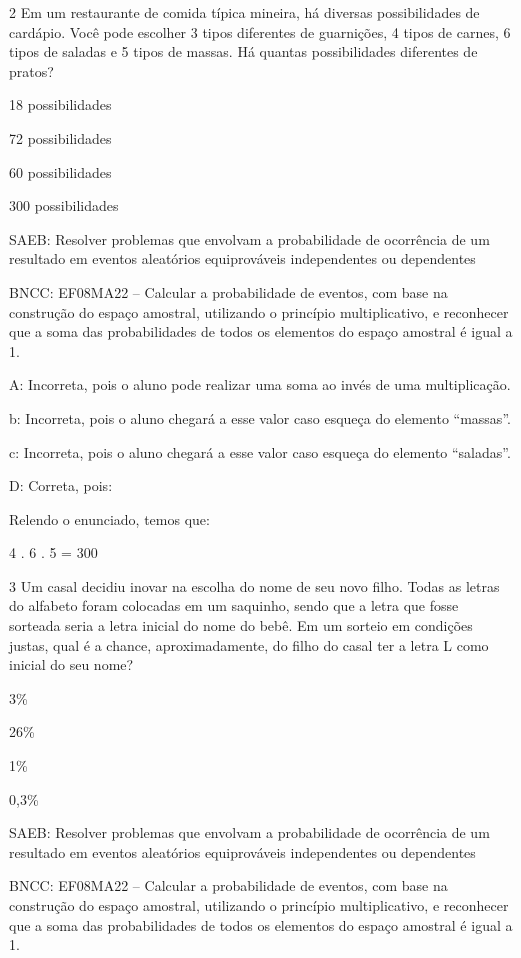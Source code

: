 {\num{2} Em um restaurante de comida típica mineira, há diversas
possibilidades de cardápio. Você pode escolher 3 tipos diferentes de
guarnições, 4 tipos de carnes, 6 tipos de saladas e 5 tipos de massas.
Há quantas possibilidades diferentes de pratos?
\item 18 possibilidades
\item 72 possibilidades
\item 60 possibilidades
\item 300 possibilidades

SAEB: Resolver problemas que envolvam a probabilidade de ocorrência de
um resultado em eventos aleatórios equiprováveis independentes ou
dependentes

BNCC: EF08MA22 -- Calcular a probabilidade de eventos, com base na
construção do espaço amostral, utilizando o princípio multiplicativo, e
reconhecer que a soma das probabilidades de todos os elementos do espaço
amostral é igual a 1.

A: Incorreta, pois o aluno pode realizar uma soma ao invés de uma
multiplicação.

b: Incorreta, pois o aluno chegará a esse valor caso esqueça do elemento
``massas''.

c: Incorreta, pois o aluno chegará a esse valor caso esqueça do elemento
``saladas''.

D: Correta, pois:

Relendo o enunciado, temos que:

4 . 6 . 5 = 300

\num{3} Um casal decidiu inovar na escolha do nome de seu novo filho. Todas
as letras do alfabeto foram colocadas em um saquinho, sendo que a letra
que fosse sorteada seria a letra inicial do nome do bebê. Em um sorteio
em condições justas, qual é a chance, aproximadamente, do filho do casal
ter a letra L como inicial do seu nome?
\item 3\%
\item 26\%
\item 1\%
\item 0,3\%


SAEB: Resolver problemas que envolvam a probabilidade de ocorrência de
um resultado em eventos aleatórios equiprováveis independentes ou
dependentes

BNCC: EF08MA22 -- Calcular a probabilidade de eventos, com base na
construção do espaço amostral, utilizando o princípio multiplicativo, e
reconhecer que a soma das probabilidades de todos os elementos do espaço
amostral é igual a 1.

}
